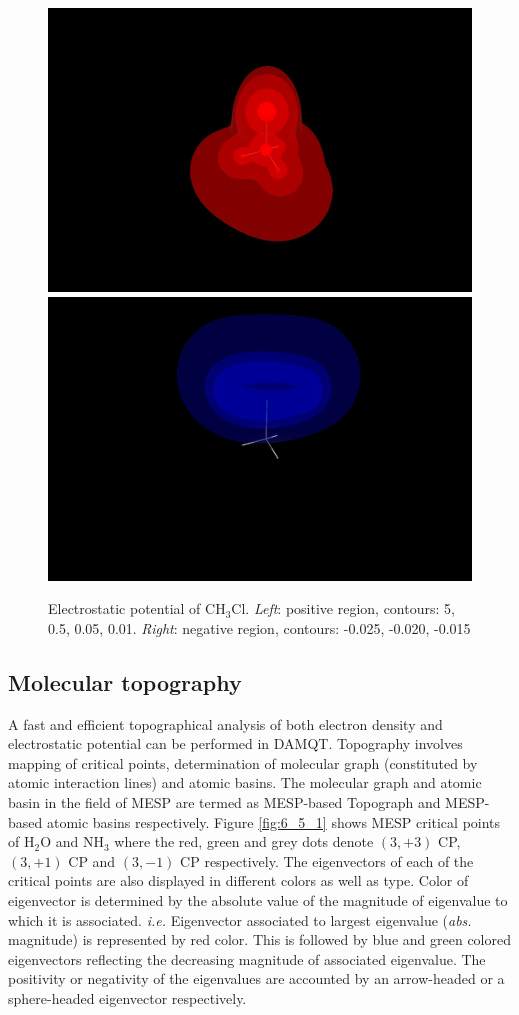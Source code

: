 \documentclass[10pt]{article}
\begin{document}
\vspace*{5mm}
\begin{figure}[H]
\begin{center}
\vspace*{-3mm}
\includegraphics[width=.4\linewidth]{CH3Cl-pot-pos-b.png}
\hspace*{5mm}
\includegraphics[width=.4\linewidth]{CH3Cl-pot-neg-b.png}
\end{center}
\caption[Electrostatic potential of CH$_3$Cl]{ Electrostatic potential of CH$_3$Cl. 
{\it Left}: positive region, contours: 5, 0.5, 0.05, 0.01. 
{\it Right}: negative region, contours: -0.025, -0.020, -0.015
\label{fig:6_4_2}}
\end{figure}


\subsection{Molecular topography \label{sec:6.5} }

A fast and efficient topographical analysis of both electron density and electrostatic potential can be 
performed in DAMQT. Topography involves mapping of critical points, determination of 
molecular graph (constituted by atomic interaction lines) and atomic basins. The 
molecular graph and atomic basin in the field of MESP are termed as 
MESP-based Topograph and MESP-based atomic basins respectively.
Figure \ref{fig:6_5_1} shows MESP critical points of H$_2$O and NH$_3$ where the red, green and grey dots 
denote $(3,+3)$ CP, $(3,+1)$ CP and $(3,-1)$ CP respectively. The eigenvectors of each of the critical points are also
displayed in different colors as well as type. Color of eigenvector is determined by the absolute value of the magnitude 
of eigenvalue to which it is associated. {\it i.e.} Eigenvector associated to largest eigenvalue ({\it abs.} magnitude) 
is represented by red color. This is followed by blue and green colored eigenvectors reflecting the decreasing magnitude of 
associated eigenvalue. The positivity or negativity of the eigenvalues are accounted by an arrow-headed or a sphere-headed
eigenvector respectively.  
\end{document}
